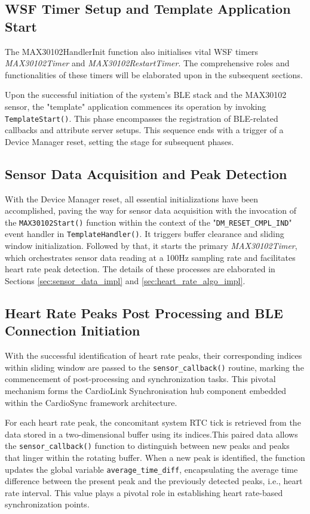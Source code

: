 \subsection{WSF Timer Setup and Template Application Start}
The MAX30102HandlerInit function also initialises vital WSF timers \textit{MAX30102Timer} and \textit{MAX30102RestartTimer}. The comprehensive roles and functionalities of these timers will be elaborated upon in the subsequent sections. 

\noindent Upon the successful initiation of the system's BLE stack and the MAX30102 sensor, the "template" application commences its operation by invoking \texttt{TemplateStart()}. This phase encompasses the registration of BLE-related callbacks and attribute server setups. This sequence ends with a trigger of a Device Manager reset, setting the stage for subsequent phases.

\subsection{Sensor Data Acquisition and Peak Detection}
With the Device Manager reset, all essential initializations have been accomplished, paving the way for sensor data acquisition with the invocation of the \texttt{MAX30102Start()} function within the context of the "\texttt{DM\_RESET\_CMPL\_IND}" event handler in \texttt{TemplateHandler()}. It triggers buffer clearance and sliding window initialization. Followed by that, it starts the primary \textit{MAX30102Timer}, which orchestrates sensor data reading at a 100Hz sampling rate and facilitates heart rate peak detection. The details of these processes are elaborated in Sections \ref{sec:sensor_data_impl} and \ref{sec:heart_rate_algo_impl}.

\subsection{Heart Rate Peaks Post Processing and BLE Connection Initiation}
With the successful identification of heart rate peaks, their corresponding indices within sliding window are passed to the \texttt{sensor\_callback()} routine, marking the commencement of post-processing and synchronization tasks. This pivotal mechanism forms the CardioLink Synchronisation hub component embedded within the CardioSync framework architecture.

\noindent For each heart rate peak, the concomitant system RTC tick is retrieved from the data stored in a two-dimensional buffer using its indices.This paired data allows the \texttt{sensor\_callback()} function to distinguish between new peaks and peaks that linger within the rotating buffer. When a new peak is identified, the function updates the global variable \texttt{average\_time\_diff}, encapsulating the average time difference between the present peak and the previously detected peaks, i.e., heart rate interval. This value plays a pivotal role in establishing heart rate-based synchronization points.

